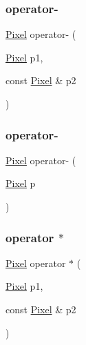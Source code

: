 \mbox{\label{class_pixel_af819541eb6c95a1ee029f62c63e6dbca}} 
\subsubsection{\texorpdfstring{operator-\/}{operator-}\hspace{0.1cm}{\footnotesize\ttfamily [1/2]}}
{\footnotesize\ttfamily \mbox{\hyperlink{class_pixel}{Pixel}} operator-\/ (\begin{DoxyParamCaption}\item[{\mbox{\hyperlink{class_pixel}{Pixel}}}]{p1,  }\item[{const \mbox{\hyperlink{class_pixel}{Pixel}} \&}]{p2 }\end{DoxyParamCaption})\hspace{0.3cm}{\ttfamily [friend]}}

\mbox{\label{class_pixel_a7936b70523ba5664cf90b70bf566879e}} 
\subsubsection{\texorpdfstring{operator-\/}{operator-}\hspace{0.1cm}{\footnotesize\ttfamily [2/2]}}
{\footnotesize\ttfamily \mbox{\hyperlink{class_pixel}{Pixel}} operator-\/ (\begin{DoxyParamCaption}\item[{\mbox{\hyperlink{class_pixel}{Pixel}}}]{p }\end{DoxyParamCaption})\hspace{0.3cm}{\ttfamily [friend]}}

\mbox{\label{class_pixel_abcf09eaa1fe9387b959ea02b003c9d10}} 
\subsubsection{\texorpdfstring{operator $\ast$}{operator *}}
{\footnotesize\ttfamily \mbox{\hyperlink{class_pixel}{Pixel}} operator $\ast$ (\begin{DoxyParamCaption}\item[{\mbox{\hyperlink{class_pixel}{Pixel}}}]{p1,  }\item[{const \mbox{\hyperlink{class_pixel}{Pixel}} \&}]{p2 }\end{DoxyParamCaption})\hspace{0.3cm}{\ttfamily [friend]}}

